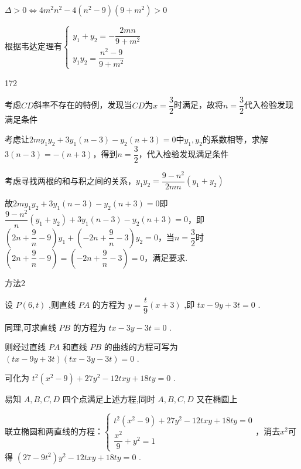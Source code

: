 \begin{enumerate}
\begin{enumerate}
\begin{jieda}
\begin{enumerate}
                $\Delta > 0 \Longleftrightarrow 4m^2n^2 - 4(n^2-9)(9+m^2) > 0$
    
                根据韦达定理有$\left\{\begin{array}{l}
                     y_1+y_2 = -\dfrac{2mn}{9+m^2} \\
                     y_1y_2 = \dfrac{n^2-9}{9+m^2}
                \end{array}\right.$
                \begin{dingautolist}{172}
                    \item 考虑$CD$斜率不存在的特例，发现当$CD$为$x = \dfrac{3}{2}$时满足，故将$n = \dfrac{3}{2}$代入检验发现满足条件
                    \item 考虑让$2my_1y_2+3y_1(n-3)-y_2(n+3) = 0$中$y_1, y_2$的系数相等，求解$3(n-3) = -(n+3)$，得到$n = \dfrac{3}{2}$，代入检验发现满足条件
                    \item 考虑寻找两根的和与积之间的关系，$y_1y_2 = \dfrac{9-n^2}{2mn}(y_1+y_2)$
    
                    故$2my_1y_2+3y_1(n-3)-y_2(n+3) = 0$即$\dfrac{9-n^2}{n}(y_1+y_2)+3y_1(n-3)-y_2(n+3) = 0$，即$\left(2n+\dfrac{9}{n}-9\right)y_1 + \left(-2n+\dfrac{9}{n}-3\right)y_2 = 0$，当$n = \dfrac{3}{2}$时$\left(2n+\dfrac{9}{n}-9\right) = \left(-2n+\dfrac{9}{n}-3\right) = 0$，满足要求.
                \end{dingautolist}
            方法2
    
                设 $P\left( {6,t}\right)$ ,则直线 ${PA}$ 的方程为 $y = \dfrac{t}{9}\left( {x + 3}\right)$ ,即 ${tx} - {9y} + {3t} = 0$ .
                
                同理,可求直线 ${PB}$ 的方程为 ${tx} - {3y} - {3t} = 0$ .
                
                则经过直线 ${PA}$ 和直线 ${PB}$ 的曲线的方程可写为 $\left( {{tx} - {9y} + {3t}}\right) \left( {{tx} - {3y} - {3t}}\right)  = 0$ .
                
                可化为 ${t}^{2}\left( {{x}^{2} - 9}\right)  + {27}{y}^{2} - {12txy} + {18ty} = 0$ .
                
                易知 $A,B,C,D$ 四个点满足上述方程,同时 $A,B,C,D$ 又在椭圆上
                
                联立椭圆和两直线的方程：$\left\{\begin{array}{l}
                     {t}^{2}\left( {{x}^{2} - 9}\right)  + {27}{y}^{2} - {12txy} + {18ty} = 0  \\
                     \dfrac{{x}^{2}}{9} + {y}^{2} = 1 
                \end{array}\right.$，消去$x^2$可得 $\left( {{27} - 9{t}^{2}}\right) {y}^{2} - {12txy} + {18ty} = 0$ .
                

\end{enumerate}
\end{jieda}
\end{enumerate}
\end{enumerate}
